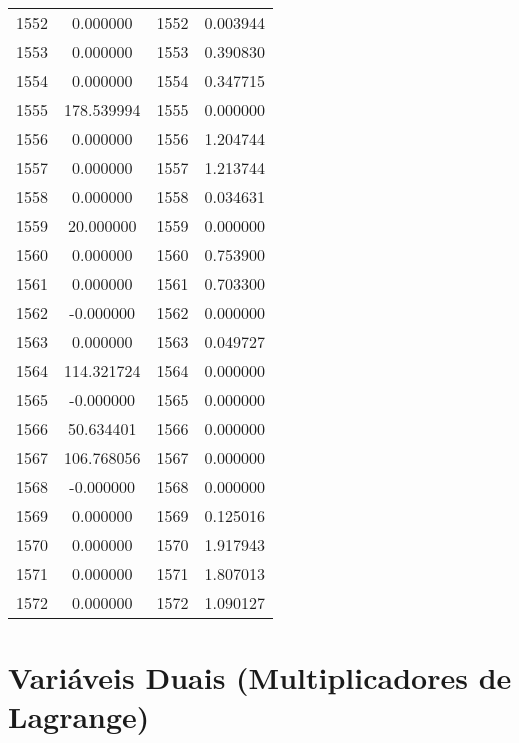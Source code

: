 \documentclass[12pt]{article}
\begin{document}
\begin{longtable}{@{}cccc@{}}
1552 & 0.000000 & 1552 & 0.003944 \\
1553 & 0.000000 & 1553 & 0.390830 \\
1554 & 0.000000 & 1554 & 0.347715 \\
1555 & 178.539994 & 1555 & 0.000000 \\
1556 & 0.000000 & 1556 & 1.204744 \\
1557 & 0.000000 & 1557 & 1.213744 \\
1558 & 0.000000 & 1558 & 0.034631 \\
1559 & 20.000000 & 1559 & 0.000000 \\
1560 & 0.000000 & 1560 & 0.753900 \\
1561 & 0.000000 & 1561 & 0.703300 \\
1562 & -0.000000 & 1562 & 0.000000 \\
1563 & 0.000000 & 1563 & 0.049727 \\
1564 & 114.321724 & 1564 & 0.000000 \\
1565 & -0.000000 & 1565 & 0.000000 \\
1566 & 50.634401 & 1566 & 0.000000 \\
1567 & 106.768056 & 1567 & 0.000000 \\
1568 & -0.000000 & 1568 & 0.000000 \\
1569 & 0.000000 & 1569 & 0.125016 \\
1570 & 0.000000 & 1570 & 1.917943 \\
1571 & 0.000000 & 1571 & 1.807013 \\
1572 & 0.000000 & 1572 & 1.090127 \\

\end{longtable}

\section{Variáveis Duais (Multiplicadores de Lagrange)}
\end{document}

